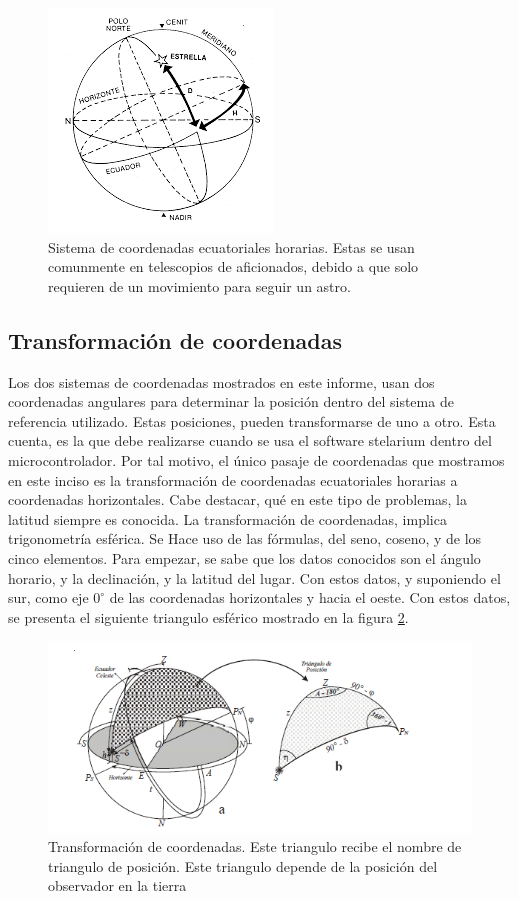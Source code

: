 \begin{figure}[ht!]
	\centering 
	\includegraphics{coord_eq_local}
	\caption{Sistema de coordenadas ecuatoriales horarias. Estas se usan comunmente en telescopios de aficionados, debido a que solo requieren de un movimiento para seguir un astro.}
	\label{fig:coord_eq}
\end{figure}

\subsection{Transformación de coordenadas}

Los dos sistemas de coordenadas mostrados en este informe, usan dos coordenadas angulares para determinar la posición dentro del sistema de referencia utilizado. Estas posiciones, pueden transformarse de uno a otro. Esta cuenta, es la que debe realizarse cuando se usa el software stelarium dentro del microcontrolador. Por tal motivo, el único pasaje de coordenadas que mostramos en este inciso es la transformación de coordenadas ecuatoriales horarias a coordenadas horizontales. Cabe destacar, qué en este tipo de problemas, la latitud siempre es conocida. 
La transformación de coordenadas, implica trigonometría esférica. Se Hace uso de las fórmulas, del seno, coseno, y de los cinco elementos. 
Para empezar, se sabe que los datos conocidos son el ángulo horario, y la declinación, y la latitud del lugar. Con estos datos, y suponiendo el sur, como eje $0^\circ$ de las coordenadas horizontales y hacia el oeste. Con estos datos, se presenta el siguiente triangulo esférico mostrado en la figura \ref{fig:triang_esfer_ha}.  


\begin{figure}[ht!]
	\includegraphics{transf_coord} 
	\caption{Transformación de coordenadas. Este triangulo recibe el nombre de triangulo de posición. Este triangulo depende de la posición del observador en la tierra}
	\label{fig:triang_esfer_ha}
\end{figure}

